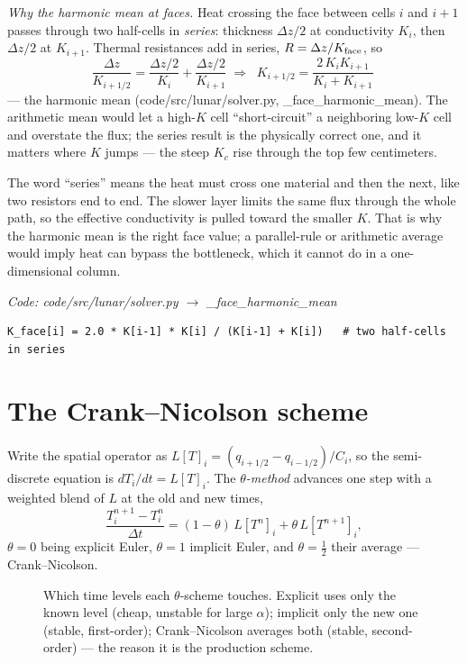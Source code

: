\documentclass[11pt]{report}
\newcommand{\code}[1]{{\ttfamily\small #1}}
\begin{document}
\emph{Why the harmonic mean at faces.} Heat crossing the face between cells $i$
and $i{+}1$ passes through two half-cells in \emph{series}: thickness
$\Delta z/2$ at conductivity $K_i$, then $\Delta z/2$ at $K_{i+1}$. Thermal
resistances add in series, $R=\Delta z/K_{\rm face}$, so
\[
\frac{\Delta z}{K_{i+1/2}} = \frac{\Delta z/2}{K_i}+\frac{\Delta z/2}{K_{i+1}}
\;\Rightarrow\;
\boxed{\;K_{i+1/2}=\frac{2\,K_i K_{i+1}}{K_i+K_{i+1}}\;}
\]
--- the harmonic mean (\code{code/src/lunar/solver.py},
\code{\_face\_harmonic\_mean}). The arithmetic mean would let a high-$K$ cell
``short-circuit'' a neighboring low-$K$ cell and overstate the flux; the series
result is the physically correct one, and it matters where $K$ jumps --- the
steep $K_c$ rise through the top few centimeters.

\begin{plain}
The word ``series'' means the heat must cross one material and then the next,
like two resistors end to end. The slower layer limits the same flux through the
whole path, so the effective conductivity is pulled toward the smaller $K$.
That is why the harmonic mean is the right face value; a parallel-rule or
arithmetic average would imply heat can bypass the bottleneck, which it cannot
do in a one-dimensional column.
\end{plain}

{\small\color{dim}\textit{Code: \code{code/src/lunar/solver.py} $\to$ \code{\_face\_harmonic\_mean}}}
\begin{lstlisting}[style=py]
K_face[i] = 2.0 * K[i-1] * K[i] / (K[i-1] + K[i])   # two half-cells in series
\end{lstlisting}

\section{The Crank--Nicolson scheme}\label{app:cn}
Write the spatial operator as $L[T]_i = (q_{i+1/2}-q_{i-1/2})/C_i$, so the
semi-discrete equation is $dT_i/dt=L[T]_i$. The \emph{$\theta$-method} advances
one step with a weighted blend of $L$ at the old and new times,
\[
\frac{T_i^{n+1}-T_i^{n}}{\Delta t}
= (1-\theta)\,L[T^{n}]_i + \theta\,L[T^{n+1}]_i,
\]
$\theta=0$ being explicit Euler, $\theta=1$ implicit Euler, and
$\theta=\tfrac12$ their average --- Crank--Nicolson.

\begin{figure}[htbp]\centering

\caption{Which time levels each $\theta$-scheme touches. Explicit uses
only the known level (cheap, unstable for large $\alpha$); implicit only
the new one (stable, first-order); Crank--Nicolson averages both (stable,
second-order) --- the reason it is the production scheme.}
\label{fig:thetastencil}
\end{figure}
\end{document}

